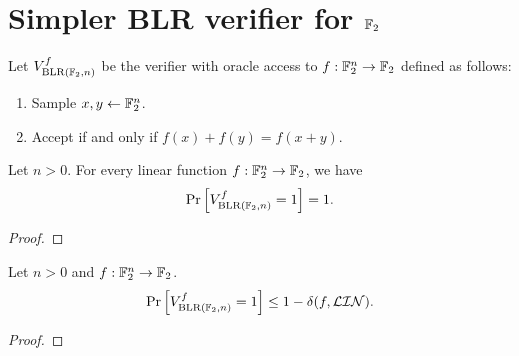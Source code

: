 \section{Simpler BLR verifier for \(\mathbb{F}_{2}\)}
\begin{definition}\label{BLR.basicVerifier}
\leanok 
Let \(V_{\mathrm{BLR}(\mathbb{F}_{2}, n)}^{f}\) be the verifier with oracle access to \(f: \mathbb{F}_{2}^n \to \mathbb{F}_{2}\) defined as follows:
\begin{enumerate}
  \item Sample \(x, y \leftarrow \mathbb{F}_2^n\).
  \item Accept if and only if \(f(x) + f(y) = f(x+y)\).
\end{enumerate}
\end{definition}

\begin{theorem}\label{BLR_basic_completeness_ZMod2}
\leanok
Let \(n > 0\). For every linear function \(f: \mathbb{F}_{2}^n \to \mathbb{F}_{2}\), we have
\[\Pr \left[V_{\mathrm{BLR}(\mathbb{F}_{2}, n)}^{f} = 1\right] = 1.\]
\end{theorem}
\begin{proof}\leanok
\end{proof}

\begin{theorem}\label{BLR_basic_soundness_ZMod2}
  \leanok
Let \(n > 0\) and \(f: \mathbb{F}_{2}^n \to \mathbb{F}_{2}\).
\[\Pr \left[V_{\mathrm{BLR}(\mathbb{F}_{2}, n)}^{f} = 1\right] \leq 1 - \delta({f}, {\mathcal{LIN}}).\]
\end{theorem}
\begin{proof}\leanok
\end{proof}
